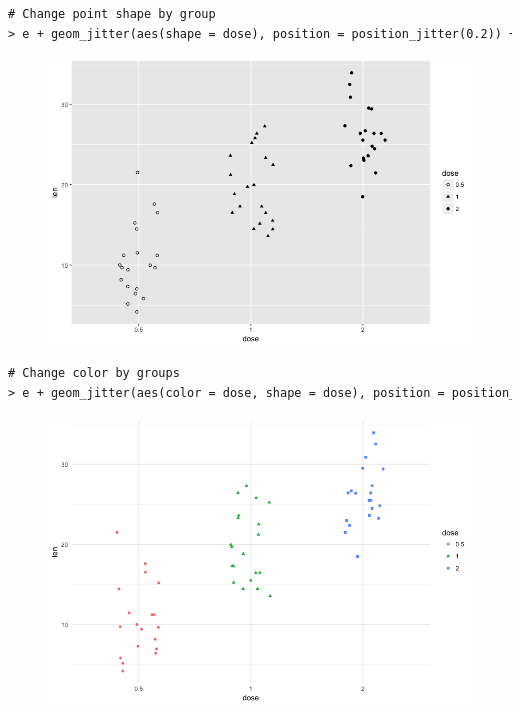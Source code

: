 \begin{lstlisting}[language=html]
# Change point shape by group
> e + geom_jitter(aes(shape = dose), position = position_jitter(0.2)) + scale_shape_manual(values = c(1,17,19))
\end{lstlisting}
\begin{figure}[H]\begin{center}\includegraphics[scale=1 ]{ilu/bg115.png}\end{center}\end{figure}
\begin{lstlisting}[language=html]
# Change color by groups
> e + geom_jitter(aes(color = dose, shape = dose), position = position_jitter(0.2)) + theme_minimal()
\end{lstlisting}
\begin{figure}[H]\begin{center}\includegraphics[scale=1 ]{ilu/bg116.png}\end{center}\end{figure}

